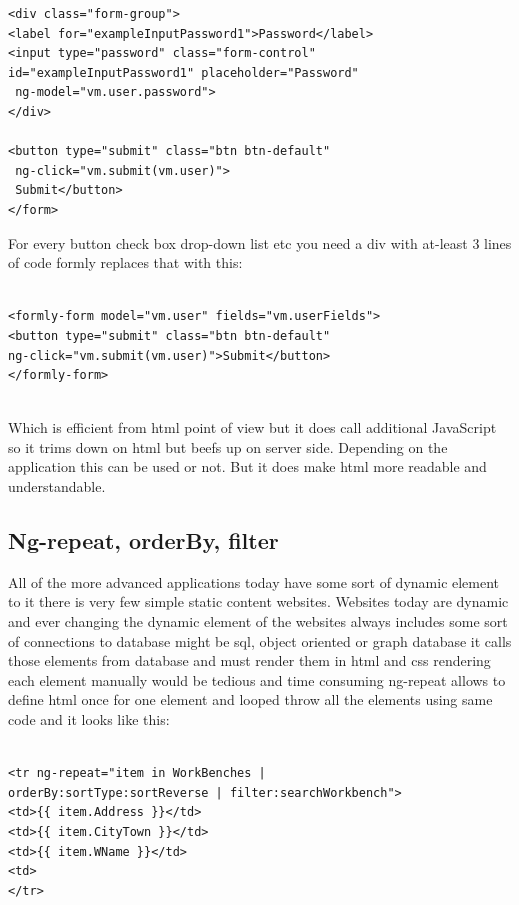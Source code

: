 \begin{itemize}
\begin{verbatim}
<div class="form-group">
<label for="exampleInputPassword1">Password</label>
<input type="password" class="form-control" 
id="exampleInputPassword1" placeholder="Password"
 ng-model="vm.user.password">
</div>

<button type="submit" class="btn btn-default"
 ng-click="vm.submit(vm.user)">
 Submit</button>
</form>

\end{verbatim}
\bigbreak
For every button check box drop-down list etc you need a div with at-least 3 lines of code formly replaces that with this:
\bigbreak

\begin{verbatim}

<formly-form model="vm.user" fields="vm.userFields">
<button type="submit" class="btn btn-default" 
ng-click="vm.submit(vm.user)">Submit</button>
</formly-form>


\end{verbatim}
\bigbreak

Which is efficient from html point of view but it does call additional JavaScript so it trims down on html but beefs up on server side. Depending on the application this can be used or not. But it does make html more readable and understandable.




\subsection{Ng-repeat, orderBy, filter}
\bigbreak

All of the more advanced applications today have some sort of dynamic element to it there is very few simple static content websites. Websites today are dynamic and ever changing the dynamic element of the websites always includes some sort of connections to database might be sql, object oriented or graph database it calls those elements from database and must render them in html and css rendering each element manually would be tedious and time consuming ng-repeat allows to define html once for one element and looped throw all the elements using same code and it looks like this:
\bigbreak

\begin{verbatim}

<tr ng-repeat="item in WorkBenches | 
orderBy:sortType:sortReverse | filter:searchWorkbench">
<td>{{ item.Address }}</td>
<td>{{ item.CityTown }}</td>
<td>{{ item.WName }}</td>
<td>
</tr>

\end{verbatim}
\bigbreak


\end{itemize}
